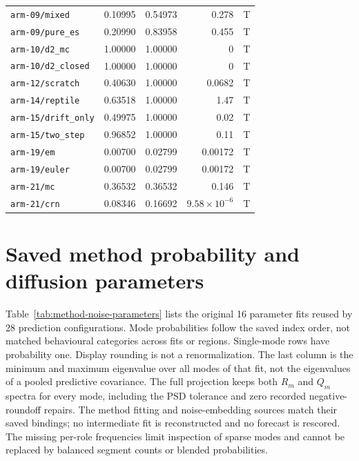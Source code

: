\begin{longtable}{lrrrl}
\texttt{arm-09/mixed} & 0.10995 & 0.54973 & 0.278 & T\\
\texttt{arm-09/pure\_es} & 0.20990 & 0.83958 & 0.455 & T\\
\texttt{arm-10/d2\_mc} & 1.00000 & 1.00000 & 0 & T\\
\texttt{arm-10/d2\_closed} & 1.00000 & 1.00000 & 0 & T\\
\texttt{arm-12/scratch} & 0.40630 & 1.00000 & 0.0682 & T\\
\texttt{arm-14/reptile} & 0.63518 & 1.00000 & 1.47 & T\\
\texttt{arm-15/drift\_only} & 0.49975 & 1.00000 & 0.02 & T\\
\texttt{arm-15/two\_step} & 0.96852 & 1.00000 & 0.11 & T\\
\texttt{arm-19/em} & 0.00700 & 0.02799 & 0.00172 & T\\
\texttt{arm-19/euler} & 0.00700 & 0.02799 & 0.00172 & T\\
\texttt{arm-21/mc} & 0.36532 & 0.36532 & 0.146 & T\\
\texttt{arm-21/crn} & 0.08346 & 0.16692 & \(9.58\times10^{-6}\) & T\\
\end{longtable}


\section{Saved method probability and diffusion parameters}
\label{sec:method-noise-parameters}\hypertarget{sec:method-noise-parameters}{}
Table~\ref{tab:method-noise-parameters} lists the original 16 parameter fits
reused by 28 prediction configurations. Mode probabilities follow the saved
index order, not matched behavioural categories across fits or regions.
Single-mode rows have probability one. Display rounding is not a
renormalization. The last column is the minimum and maximum eigenvalue over
all modes of that fit, not the eigenvalues of a pooled predictive covariance.
The full projection keeps both $R_m$ and $Q_m$ spectra for every mode,
including the PSD tolerance and zero recorded negative-roundoff repairs.
The method fitting and noise-embedding sources match their saved bindings;
no intermediate fit is reconstructed and no forecast is rescored.
The missing per-role frequencies limit inspection of sparse modes and
cannot be replaced by balanced segment counts or blended probabilities.

